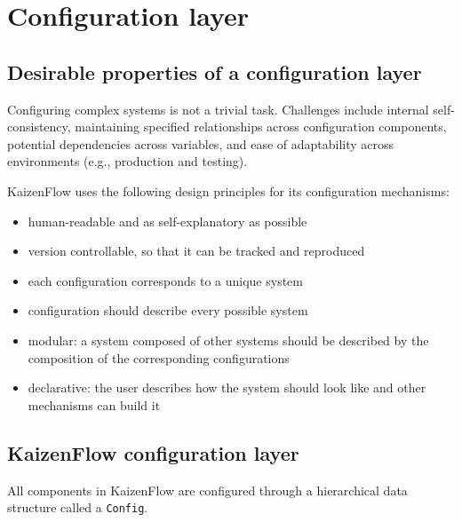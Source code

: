 \documentclass[11pt, reqno]{amsart}
\theoremstyle{definition}
\theoremstyle{remark}
\begin{document}
  \section{Configuration layer}

  \subsection{Desirable properties of a configuration layer}
  Configuring complex systems is not a trivial task. Challenges include internal
  self-consistency, maintaining specified relationships across configuration
  components, potential dependencies across variables, and ease of adaptability
  across environments (e.g., production and testing).

  KaizenFlow uses the following design principles for its configuration
  mechanisms:

  \begin{itemize}
    \item human-readable and as self-explanatory as possible

    \item version controllable, so that it can be tracked and reproduced

    \item each configuration corresponds to a unique system

    \item configuration should describe every possible system

    \item modular: a system composed of other systems should be described by the
      composition of the corresponding configurations

    \item declarative: the user describes how the system should look like and
      other mechanisms can build it
  \end{itemize}

  \subsection{KaizenFlow configuration layer}
  All components in KaizenFlow are configured through a hierarchical data structure
  called a \verb|Config|.
\end{document}
